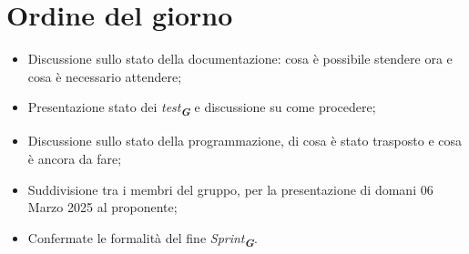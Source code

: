 

\section{Ordine del giorno}

\begin{itemize}
    \item Discussione sullo stato della documentazione: cosa è possibile stendere ora e cosa è necessario attendere;
    \item Presentazione stato dei \emph{test}\textsubscript{\textit{\textbf{G}}} e discussione su come procedere;
    \item Discussione sullo stato della programmazione, di cosa è stato trasposto e cosa è ancora da fare;
    \item Suddivisione tra i membri del gruppo, per la presentazione di domani 06 Marzo 2025 al proponente;
    \item Confermate le formalità del fine \emph{Sprint}\textsubscript{\textit{\textbf{G}}}.
\end{itemize}